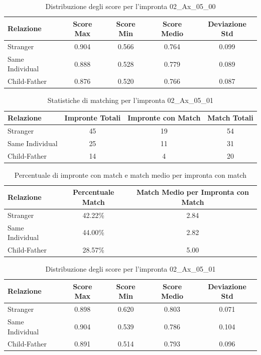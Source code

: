 \begin{table}[htbp]
\centering
\caption{Distribuzione degli score per l'impronta 02\_Ax\_05\_00}
\label{tab:scores_02_Ax_05_00}
\begin{tabular}{|l|c|c|c|c|}
\hline
\textbf{Relazione} & \textbf{Score Max} & \textbf{Score Min} & \textbf{Score Medio} & \textbf{Deviazione Std} \\
\hline
Stranger & 0.904 & 0.566 & 0.764 & 0.099 \\
\hline
Same Individual & 0.888 & 0.528 & 0.779 & 0.089 \\
\hline
Child-Father & 0.876 & 0.520 & 0.766 & 0.087 \\
\hline
\end{tabular}
\end{table}


\begin{table}[htbp]
\centering
\caption{Statistiche di matching per l'impronta 02\_Ax\_05\_01}
\label{tab:results_02_Ax_05_01}
\begin{tabular}{|l|c|c|c|}
\hline
\textbf{Relazione} & \textbf{Impronte Totali} & \textbf{Impronte con Match} & \textbf{Match Totali} \\
\hline
Stranger & 45 & 19 & 54 \\
\hline
Same Individual & 25 & 11 & 31 \\
\hline
Child-Father & 14 & 4 & 20 \\
\hline
\end{tabular}
\end{table}


\begin{table}[htbp]
\centering
\caption{Percentuale di impronte con match e match medio per impronta con match}
\label{tab:match_percentage_02_Ax_05_01}
\begin{tabular}{|l|c|c|}
\hline
\textbf{Relazione} & \textbf{Percentuale Match} & \textbf{Match Medio per Impronta con Match} \\
\hline
Stranger & 42.22\% & 2.84 \\
\hline
Same Individual & 44.00\% & 2.82 \\
\hline
Child-Father & 28.57\% & 5.00 \\
\hline
\end{tabular}
\end{table}


\begin{table}[htbp]
\centering
\caption{Distribuzione degli score per l'impronta 02\_Ax\_05\_01}
\label{tab:scores_02_Ax_05_01}
\begin{tabular}{|l|c|c|c|c|}
\hline
\textbf{Relazione} & \textbf{Score Max} & \textbf{Score Min} & \textbf{Score Medio} & \textbf{Deviazione Std} \\
\hline
Stranger & 0.898 & 0.620 & 0.803 & 0.071 \\
\hline
Same Individual & 0.904 & 0.539 & 0.786 & 0.104 \\
\hline
Child-Father & 0.891 & 0.514 & 0.793 & 0.096 \\
\hline
\end{tabular}
\end{table}


